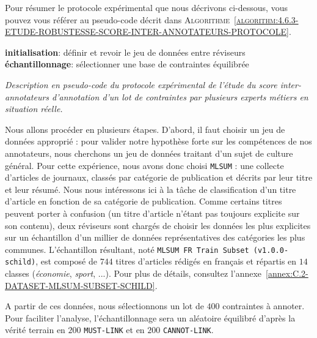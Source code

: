 			Pour résumer le protocole expérimental que nous décrivons ci-dessous, vous pouvez vous référer au pseudo-code décrit dans \textsc{Algorithme~\ref{algorithm:4.6.3-ETUDE-ROBUSTESSE-SCORE-INTER-ANNOTATEURS-PROTOCOLE}}.

			\begin{algorithm}
				\textbf{initialisation}: définir et revoir le jeu de données entre réviseurs \;
				\textbf{échantillonnage}: sélectionner une base de contraintes équilibrée \;
				\caption{\textit{
					Description en pseudo-code du protocole expérimental de l'étude du score inter-annotateurs d'annotation d'un lot de contraintes par plusieurs experts métiers en situation réelle.
				}}
				\label{algorithm:4.3.3-ETUDE-COUTS-TEMPS-ANNOTATION-PROTOCOLE}
			\end{algorithm}
			
			Nous allons procéder en plusieurs étapes.
			D'abord, il faut choisir un jeu de données approprié : pour valider notre hypothèse forte sur les compétences de nos annotateurs, nous cherchons un jeu de données traitant d'un sujet de culture général.
			Pour cette expérience, nous avons donc choisi \texttt{MLSUM} : une collecte d'articles de journaux, classés par catégorie de publication et décrits par leur titre et leur résumé.
			Nous nous intéressons ici à la tâche de classification d'un titre d'article en fonction de sa catégorie de publication.
			Comme certains titres peuvent porter à confusion (un titre d'article n'étant pas toujours explicite sur son contenu), deux réviseurs sont chargés de choisir les données les plus explicites sur un échantillon d'un millier de données représentatives des catégories les plus communes.
			L'échantillon résultant, noté \texttt{MLSUM FR Train Subset (v1.0.0-schild)}, est composé de $744$ titres d'articles rédigés en français et répartis en $14$ classes (\textit{économie}, \textit{sport}, ...).
			Pour plus de détails, consultez l'annexe~\ref{annex:C.2-DATASET-MLSUM-SUBSET-SCHILD}.
		
			A partir de ces données, nous sélectionnons un lot de $400$ contraintes à annoter.
			Pour faciliter l'analyse, l'échantillonnage sera un aléatoire équilibré d'après la vérité terrain en $200$ \texttt{MUST-LINK} et en $200$ \texttt{CANNOT-LINK}.
			
